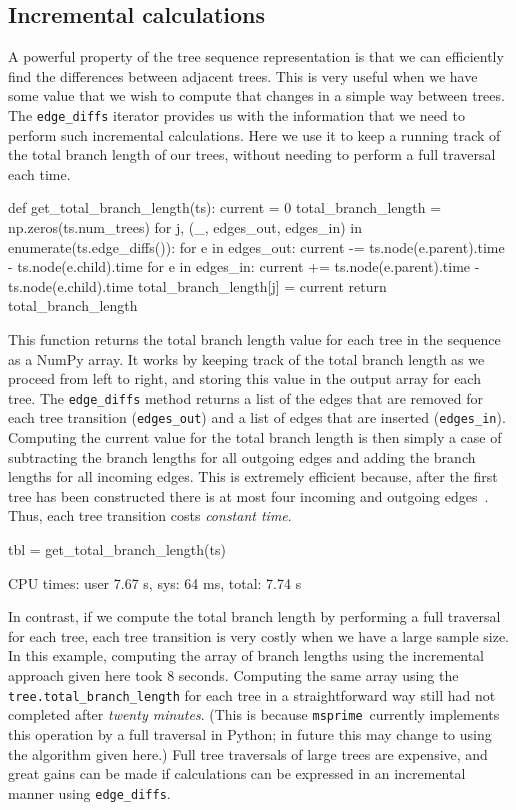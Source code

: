 \documentclass[graybox]{svmult}
\newcommand{\msprime}[0]{\texttt{msprime}}
\begin{document}
\subsection{Incremental calculations}\label{incremental-calculations}

A powerful property of the tree sequence representation is that we can
efficiently find the differences between adjacent trees. This is very
useful when we have some value that we wish to compute that changes in a
simple way between trees. The \texttt{edge\_diffs} iterator provides us
with the information that we need to perform such incremental
calculations. Here we use it to keep a running track of the total branch
length of our trees, without needing to perform a full traversal each
time.

\begin{pythoncode}
def get_total_branch_length(ts):
    current = 0
    total_branch_length = np.zeros(ts.num_trees)
    for j, (_, edges_out, edges_in) in enumerate(ts.edge_diffs()):
        for e in edges_out:
            current -= ts.node(e.parent).time - ts.node(e.child).time
        for e in edges_in:
            current += ts.node(e.parent).time - ts.node(e.child).time
        total_branch_length[j] = current
    return total_branch_length
\end{pythoncode}

    This function returns the total branch length value for each tree in the
sequence as a NumPy array. It works by keeping track of the total branch
length as we proceed from left to right, and storing this value in the
output array for each tree. The \texttt{edge\_diffs} method returns a
list of the edges that are removed for each tree transition
(\texttt{edges\_out}) and a list of edges that are inserted
(\texttt{edges\_in}). Computing the current value for the total branch
length is then simply a case of subtracting the branch lengths for all
outgoing edges and adding the branch lengths for all incoming edges.
This is extremely efficient because, after the first tree has been
constructed there is at most four incoming and outgoing edges~\citep{kelleher2016efficient}. Thus,
each tree transition costs \emph{constant time}.

\begin{pythoncode}
tbl = get_total_branch_length(ts)

CPU times: user 7.67 s, sys: 64 ms, total: 7.74 s
\end{pythoncode}

In contrast, if we compute the total branch length by performing a
full traversal for each tree, each tree transition is very costly
when we have a large sample size. In this example, computing the array of branch lengths
using the incremental approach given here took 8 seconds. Computing the
same array using the \texttt{tree.total\_branch\_length} for each tree
in a straightforward way still had not completed after \emph{twenty
minutes}. (This is because \msprime\ currently implements this operation
by a full traversal in Python; in future this may change to using the
algorithm given here.) Full tree traversals of large trees are
expensive, and great gains can be made if calculations can be expressed
in an incremental manner using \texttt{edge\_diffs}.
\end{document}
